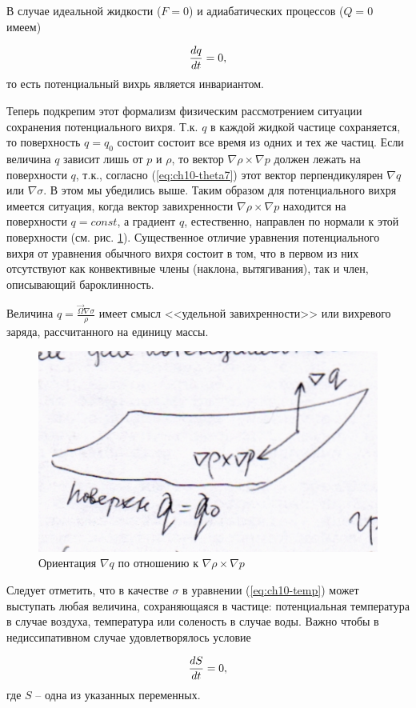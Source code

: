 В случае идеальной жидкости ($F=0$) и адиабатических процессов ($Q=0$ имеем)

\begin{equation}
    \label{eq:ch10-theta10}
    \displaystyle\frac{d q}{d t} = 0,
\end{equation}
то есть потенциальный вихрь является инвариантом.

Теперь подкрепим этот формализм физическим рассмотрением ситуации сохранения потенциального вихря. Т.к. $q$ в каждой жидкой частице сохраняется, то поверхность $q=q_0$ состоит состоит все время из одних и тех же частиц. Если величина $q$ зависит лишь от $p$ и $\rho$, то вектор $\nabla\rho\times\nabla p$ должен лежать на поверхности $q$, т.к., согласно (\ref{eq:ch10-theta7}) этот вектор перпендикулярен $\nabla q$ или $\nabla\sigma$. В этом мы убедились выше. Таким образом для потенциального вихря имеется ситуация, когда вектор завихренности $\nabla\rho\times\nabla p$ находится на поверхности $q=const$, а градиент $q$, естественно, направлен по нормали к этой поверхности (см. рис. \ref{fig:ch10.4}). Существенное отличие уравнения потенциального вихря от уравнения обычного вихря состоит в том, что в первом из них отсутствуют как конвективные члены (наклона, вытягивания), так и член, описывающий бароклинность. 

Величина $q=\frac{\vec{\Omega}\nabla\sigma}{\rho}$ имеет смысл <<удельной завихренности>> или вихревого заряда, рассчитанного на единицу массы. 

    \begin{figure}[h]
    \centering
    \includegraphics[width=0.5\linewidth]{pics/ch10.4.png}
    \caption{\label{fig:ch10.4}
    Ориентация $\nabla q$ по отношению к $\nabla\rho\times\nabla p$
    }
    \end{figure}    

Следует отметить, что в качестве $\sigma$ в уравнении (\ref{eq:ch10-temp}) может выступать любая величина, сохраняющаяся в частице: потенциальная температура в случае воздуха, температура или соленость в случае воды. Важно чтобы в недиссипативном случае удовлетворялось условие

\begin{equation}
    \label{eq:ch10-theta11}
    \displaystyle\frac{d S}{d t}=0,
\end{equation}
где $S$ -- одна из указанных переменных.

